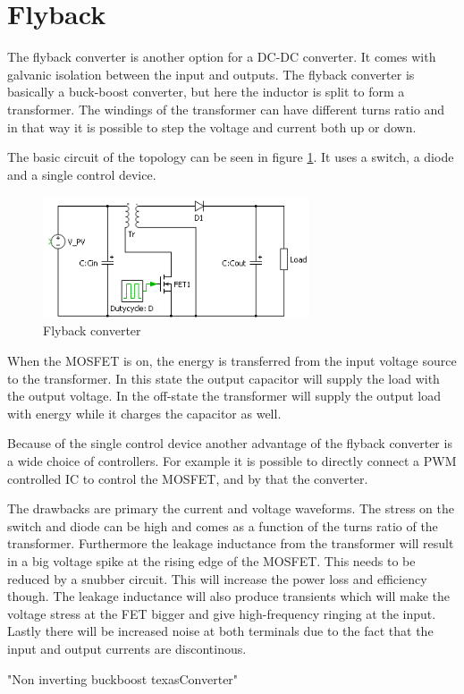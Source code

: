 \section{Flyback}

The flyback converter is another option for a DC-DC converter. It comes with galvanic isolation between the input and outputs. The flyback converter is basically a buck-boost converter, but here the inductor is split to form a transformer. The windings of the transformer can have different turns ratio and in that way it is possible to step the voltage and current both up or down. 

The basic circuit of the topology can be seen in figure \ref{Flyback_SCHEMATIC}. It uses a switch, a diode and a single control device.    

\begin{figure}[htbp]
	\begin{center}
	\includegraphics[width=0.7\textwidth]{../Pictures/flyback_schem.png}
	\caption{Flyback converter}
	\label{Flyback_SCHEMATIC}
	\end{center}
\end{figure}

When the MOSFET is on, the energy is transferred from the input voltage source to the transformer. In this state the output capacitor will supply the load with the output voltage. In the off-state the transformer will supply the output load with energy while it charges the capacitor as well. \cite{wiki}

Because of the single control device another advantage of the flyback converter is a wide choice of controllers. For example it is possible to directly connect a PWM controlled IC to control the MOSFET, and by that the converter. 

The drawbacks are primary the current and voltage waveforms. The stress on the switch and diode can be high and comes as a function of the turns ratio of the transformer. Furthermore the leakage inductance from the transformer will result in a big voltage spike at the rising edge of the MOSFET. This needs to be reduced by a snubber circuit. This will increase the power loss and efficiency though. The leakage inductance will also produce transients which will make the voltage stress at the FET bigger and give high-frequency ringing at the input. Lastly there will be increased noise at both terminals due to the fact that the input and output currents are discontinous. 

"Non inverting buckboost texasConverter"
